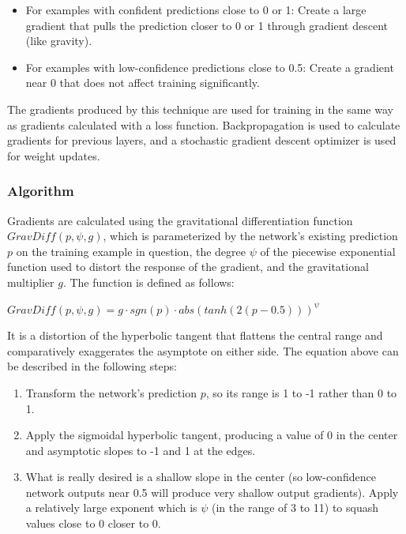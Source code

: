 \documentclass[10pt]{article}
\begin{document}
\begin{itemize}
    \item For examples with confident predictions close to 0 or 1: Create a large gradient that pulls the prediction closer to 0 or 1 through gradient descent (like gravity).
    \item For examples with low-confidence predictions close to 0.5: Create a gradient near 0 that does not affect training significantly.
\end{itemize}

The gradients produced by this technique are used for training in the same way as gradients calculated with a loss function. Backpropagation is used to calculate gradients for previous layers, and a stochastic gradient descent optimizer is used for weight updates.

\subsubsection{Algorithm}

Gradients are calculated using the gravitational differentiation function $GravDiff(p, \psi, g)$, which is parameterized by the network's existing prediction $p$ on the training example in question, the degree $\psi$ of the piecewise exponential function used to distort the response of the gradient, and the gravitational multiplier $g$. The function is defined as follows:

$GravDiff(p, \psi, g) = g \cdot sgn(p) \cdot abs(tanh(2(p - 0.5))) ^ \psi$

It is a distortion of the hyperbolic tangent that flattens the central range and comparatively exaggerates the asymptote on either side. The equation above can be described in the following steps:

\begin{enumerate}
    \item Transform the network's prediction $p$, so its range is 1 to -1 rather than 0 to 1.
    \item Apply the sigmoidal hyperbolic tangent, producing a value of 0 in the center and asymptotic slopes to -1 and 1 at the edges.
    \item \label{exponent} What is really desired is a shallow slope in the center (so low-confidence network outputs near 0.5 will produce very shallow output gradients). Apply a relatively large exponent which is $\psi$ (in the range of 3 to 11) to squash values close to 0 closer to 0.
\end{enumerate}
\end{document}
